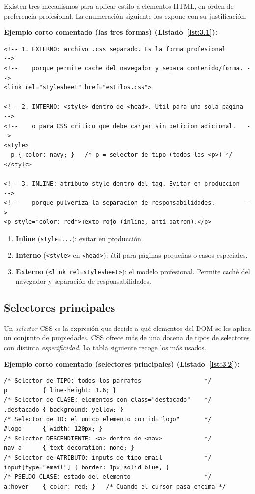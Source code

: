 \documentclass[11pt,a4paper,openany]{book}
\begin{document}
Existen tres mecanismos para aplicar estilo a elementos HTML, en
orden de preferencia profesional. La enumeración siguiente los
expone con su justificación.

\textbf{Ejemplo corto comentado (las tres formas) (Listado~\ref{lst:3.1}):}
\begin{lstlisting}[language=HTML5,numbers=none,caption={Ejemplo de HTML},label=lst:3.1]
<!-- 1. EXTERNO: archivo .css separado. Es la forma profesional       -->
<!--    porque permite cache del navegador y separa contenido/forma. -->
<link rel="stylesheet" href="estilos.css">

<!-- 2. INTERNO: <style> dentro de <head>. Util para una sola pagina  -->
<!--    o para CSS critico que debe cargar sin peticion adicional.   -->
<style>
  p { color: navy; }   /* p = selector de tipo (todos los <p>) */
</style>

<!-- 3. INLINE: atributo style dentro del tag. Evitar en produccion   -->
<!--    porque pulveriza la separacion de responsabilidades.        -->
<p style="color: red">Texto rojo (inline, anti-patron).</p>
\end{lstlisting}


\begin{enumerate}
\item \textbf{Inline} (\texttt{style=...}): evitar en producción.
\item \textbf{Interno} (\texttt{<style>} en \texttt{<head>}): útil
para páginas pequeñas o casos especiales.
\item \textbf{Externo} (\texttt{<link rel=stylesheet>}): el modelo
profesional. Permite caché del navegador y separación de
responsabilidades.
\end{enumerate}

\subsection{Selectores principales}

Un \emph{selector} CSS es la expresión que decide a qué
elementos del DOM se les aplica un conjunto de propiedades. CSS
ofrece más de una docena de tipos de selectores con distinta
\emph{especificidad}. La tabla siguiente recoge los más usados.

\textbf{Ejemplo corto comentado (selectores principales) (Listado~\ref{lst:3.2}):}
\begin{lstlisting}[language=HTML5,numbers=none,caption={Ejemplo de HTML},label=lst:3.2]
/* Selector de TIPO: todos los parrafos                  */
p          { line-height: 1.6; }
/* Selector de CLASE: elementos con class="destacado"    */
.destacado { background: yellow; }
/* Selector de ID: el unico elemento con id="logo"       */
#logo      { width: 120px; }
/* Selector DESCENDIENTE: <a> dentro de <nav>            */
nav a      { text-decoration: none; }
/* Selector de ATRIBUTO: inputs de tipo email            */
input[type="email"] { border: 1px solid blue; }
/* PSEUDO-CLASE: estado del elemento                     */
a:hover    { color: red; }   /* Cuando el cursor pasa encima */
\end{lstlisting}
\end{document}
